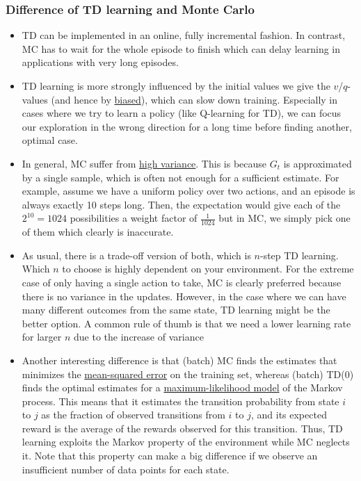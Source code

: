 \subsubsection{Difference of TD learning and Monte Carlo}
\label{sec:value_based_tabular_difference_TD_MC}
\begin{itemize}
	\item TD can be implemented in an online, fully incremental fashion. In contrast, MC has to wait for the whole episode to finish which can delay learning in applications with very long episodes.
	\item TD learning is more strongly influenced by the initial values we give the $v$/$q$-values (and hence by \underline{biased}), which can slow down training. Especially in cases where we try to learn a policy (like Q-learning for TD), we can focus our exploration in the wrong direction for a long time before finding another, optimal case.
	\item In general, MC suffer from \underline{high variance}. This is because $G_t$ is approximated by a single sample, which is often not enough for a sufficient estimate. For example, assume we have a uniform policy over two actions, and an episode is always exactly 10 steps long. Then, the expectation would give each of the $2^{10}=1024$ possibilities a weight factor of $\frac{1}{1024}$ but in MC, we simply pick one of them which clearly is inaccurate.
	\item As usual, there is a trade-off version of both, which is $n$-step TD learning. Which $n$ to choose is highly dependent on your environment. For the extreme case of only having a single action to take, MC is clearly preferred because there is no variance in the updates. However, in the case where we can have many different outcomes from the same state, TD learning might be the better option. A common rule of thumb is that we need a lower learning rate for larger $n$ due to the increase of variance
	\item Another interesting difference is that (batch) MC finds the estimates that minimizes the \underline{mean-squared error} on the training set, whereas (batch) TD(0) finds the optimal estimates for a \underline{maximum-likelihood model} of the Markov process. This means that it estimates the transition probability from state $i$ to $j$ as the fraction of observed transitions from $i$ to $j$, and its expected reward is the average of the rewards observed for this transition. Thus, TD learning exploits the Markov property of the environment while MC neglects it. Note that this property can make a big difference if we observe an insufficient number of data points for each state.
\end{itemize}
